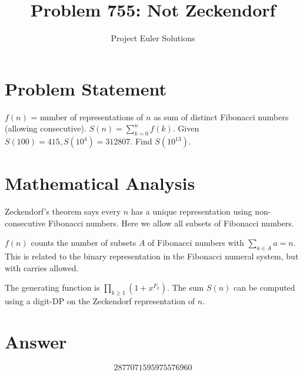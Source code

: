\documentclass[11pt]{article}
\title{Problem 755: Not Zeckendorf}
\author{Project Euler Solutions}
\date{}
\begin{document}
\maketitle


\section{Problem Statement}
$f(n)$ = number of representations of $n$ as sum of distinct Fibonacci numbers (allowing consecutive). $S(n) = \sum_{{k=0}}^n f(k)$. Given $S(100)=415, S(10^4)=312807$. Find $S(10^{{13}})$.

\section{Mathematical Analysis}
Zeckendorf's theorem says every $n$ has a unique representation using non-consecutive Fibonacci numbers. Here we allow all subsets of Fibonacci numbers.

$f(n)$ counts the number of subsets $A$ of Fibonacci numbers with $\sum_{{a\in A}} a = n$. This is related to the binary representation in the Fibonacci numeral system, but with carries allowed.

The generating function is $\prod_{{k\ge 1}} (1 + x^{{F_k}})$. The sum $S(n)$ can be computed using a digit-DP on the Zeckendorf representation of $n$.

\section{Answer}

\[
\boxed{2877071595975576960}
\]
\end{document}
